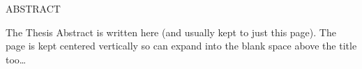 %


\addchaptertocentry{\abstractname} %

\begin{center}
\MakeUppercase{Abstract}\\ \bigskip
\end{center}

The Thesis Abstract is written here (and usually kept to just this page). The page is kept centered vertically so can expand into the blank space above the title too\ldots




